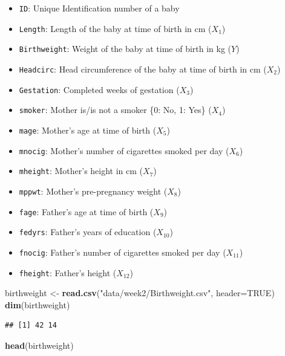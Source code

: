 \documentclass[
]{book}
\newenvironment{Shaded}{\begin{snugshade}}{\end{snugshade}}
\newcommand{\AttributeTok}[1]{\textcolor[rgb]{0.13,0.29,0.53}{#1}}
\newcommand{\ConstantTok}[1]{\textcolor[rgb]{0.56,0.35,0.01}{#1}}
\newcommand{\FunctionTok}[1]{\textcolor[rgb]{0.13,0.29,0.53}{\textbf{#1}}}
\newcommand{\NormalTok}[1]{#1}
\newcommand{\OtherTok}[1]{\textcolor[rgb]{0.56,0.35,0.01}{#1}}
\newcommand{\StringTok}[1]{\textcolor[rgb]{0.31,0.60,0.02}{#1}}
\providecommand{\tightlist}{%
  \setlength{\itemsep}{0pt}\setlength{\parskip}{0pt}}
\begin{document}
\begin{itemize}
\tightlist
\item
  \texttt{ID}: Unique Identification number of a baby
\item
  \texttt{Length}: Length of the baby at time of birth in cm (\(X_1\))
\item
  \texttt{Birthweight}: Weight of the baby at time of birth in kg (\(Y\))
\item
  \texttt{Headcirc}: Head circumference of the baby at time of birth in cm (\(X_2\))
\item
  \texttt{Gestation}: Completed weeks of gestation (\(X_3\))
\item
  \texttt{smoker}: Mother is/is not a smoker \{0: No, 1: Yes\} (\(X_4\))
\item
  \texttt{mage}: Mother's age at time of birth (\(X_5\))
\item
  \texttt{mnocig}: Mother's number of cigarettes smoked per day (\(X_6\))
\item
  \texttt{mheight}: Mother's height in cm (\(X_7\))
\item
  \texttt{mppwt}: Mother's pre-pregnancy weight (\(X_8\))
\item
  \texttt{fage}: Father's age at time of birth (\(X_9\))
\item
  \texttt{fedyrs}: Father's years of education (\(X_{10}\))
\item
  \texttt{fnocig}: Father's number of cigarettes smoked per day (\(X_{11}\))
\item
  \texttt{fheight}: Father's height (\(X_{12}\))
\end{itemize}

\begin{Shaded}
\begin{Highlighting}[]
\NormalTok{birthweight }\OtherTok{\textless{}{-}} \FunctionTok{read.csv}\NormalTok{(}\StringTok{"data/week2/Birthweight.csv"}\NormalTok{, }\AttributeTok{header=}\ConstantTok{TRUE}\NormalTok{)}
\FunctionTok{dim}\NormalTok{(birthweight)}
\end{Highlighting}
\end{Shaded}

\begin{verbatim}
## [1] 42 14
\end{verbatim}

\begin{Shaded}
\begin{Highlighting}[]
\FunctionTok{head}\NormalTok{(birthweight)}
\end{Highlighting}
\end{Shaded}
\end{document}
